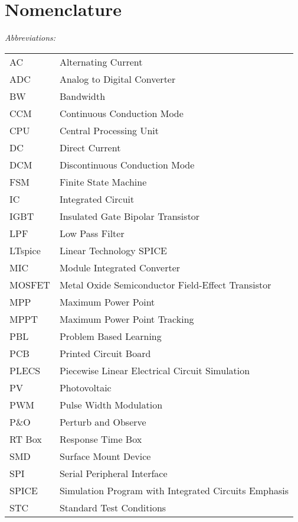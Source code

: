 \chapter*{Nomenclature}


\vspace{-10mm} %
\textit{Abbreviations:}\newline
\begin{tabular}{ll} %
AC & Alternating Current\\
ADC & Analog to Digital Converter \\
BW & Bandwidth \\
CCM & Continuous Conduction Mode\\
CPU & Central Processing Unit \\
DC & Direct Current\\
DCM & Discontinuous Conduction Mode\\
FSM & Finite State Machine \\
IC & Integrated Circuit\\
IGBT & Insulated Gate Bipolar Transistor \\
LPF & Low Pass Filter\\
LTspice & Linear Technology SPICE \\
MIC & Module Integrated Converter\\
MOSFET & Metal Oxide Semiconductor Field-Effect Transistor\\
MPP & Maximum Power Point\\
MPPT & Maximum Power Point Tracking\\
PBL & Problem Based Learning\\
PCB & Printed Circuit Board\\
PLECS & Piecewise Linear Electrical Circuit Simulation\\
PV & Photovoltaic\\
PWM & Pulse Width Modulation\\
P\&O & Perturb and Observe\\
RT Box & Response Time Box \\
SMD & Surface Mount Device \\
SPI & Serial Peripheral Interface\\
SPICE & Simulation Program with Integrated Circuits Emphasis \\
STC & Standard Test Conditions\\
\end{tabular}

